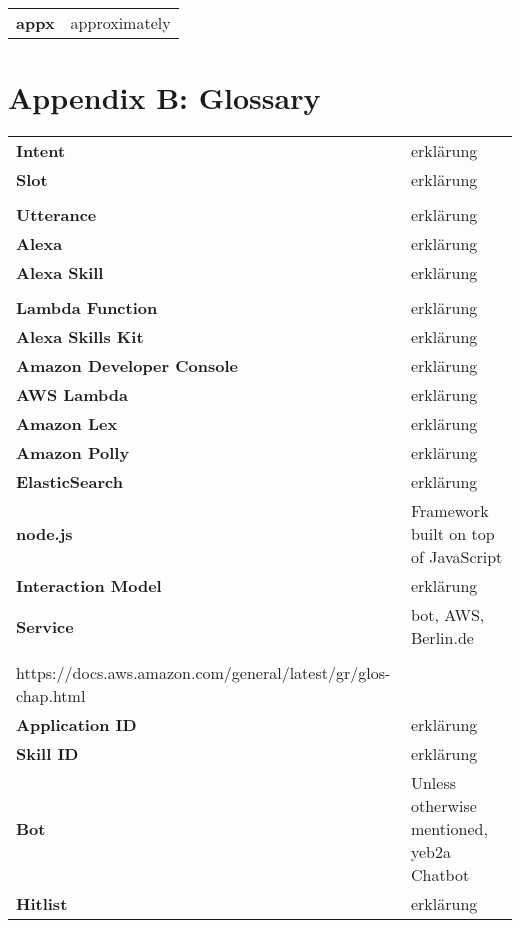 \begin{flushleft}
\begin{tabular}{ll}
\textbf{appx}	&	approximately\\
\end{tabular}
\end{flushleft}

\newpage
\section*{Appendix B: Glossary}
%

\begin{flushleft}
\begin{tabular}{ll}
\textbf{Intent}	&	erklärung\\
\textbf{Slot}	&	erklärung\\
\\
\textbf{Utterance}	&	erklärung\\
\textbf{Alexa}	&	erklärung\\
\textbf{Alexa Skill}	&	erklärung\\
\\
\textbf{Lambda Function}	&	erklärung\\
\textbf{Alexa Skills Kit}	&	erklärung\\
\textbf{Amazon Developer Console}	&	erklärung\\
\textbf{AWS Lambda}	&	erklärung\\
\textbf{Amazon Lex}	&	erklärung\\
\textbf{Amazon Polly}	&	erklärung\\
\textbf{ElasticSearch}	&	erklärung\\
\textbf{node.js}	&	Framework built on top of JavaScript\\
\textbf{Interaction Model}	&	erklärung\\
\textbf{Service}	&	bot, AWS, Berlin.de\\
\\
https://docs.aws.amazon.com/general/latest/gr/glos-chap.html
\\
\textbf{Application ID}	&	erklärung\\
\textbf{Skill ID}	&	erklärung\\
\textbf{Bot}	&	Unless otherwise mentioned, yeb2a Chatbot\\
\textbf{Hitlist}	&	erklärung\\


\end{tabular}
\end{flushleft}
